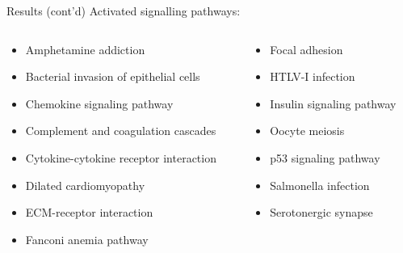 \documentclass{beamer}
\begin{document}
\begin{frame}{Results (cont'd)}
	Activated signalling pathways:
	\begin{columns}
		\begin{column}[t]{.48\textwidth}
			\begin{itemize}
				\item Amphetamine addiction
				\item Bacterial invasion of epithelial cells
				\item Chemokine signaling pathway
				\item Complement and coagulation cascades
				\item Cytokine-cytokine receptor interaction
				\item Dilated cardiomyopathy
				\item ECM-receptor interaction
				\item Fanconi anemia pathway
			\end{itemize}
		\end{column}
		\begin{column}[t]{.48\textwidth}
			\begin{itemize}
				\item Focal adhesion
				\item HTLV-I infection
				\item Insulin signaling pathway
				\item Oocyte meiosis
				\item p53 signaling pathway
				\item Salmonella infection
				\item Serotonergic synapse
			\end{itemize}
		\end{column}
	\end{columns}
\end{frame}
\end{document}
